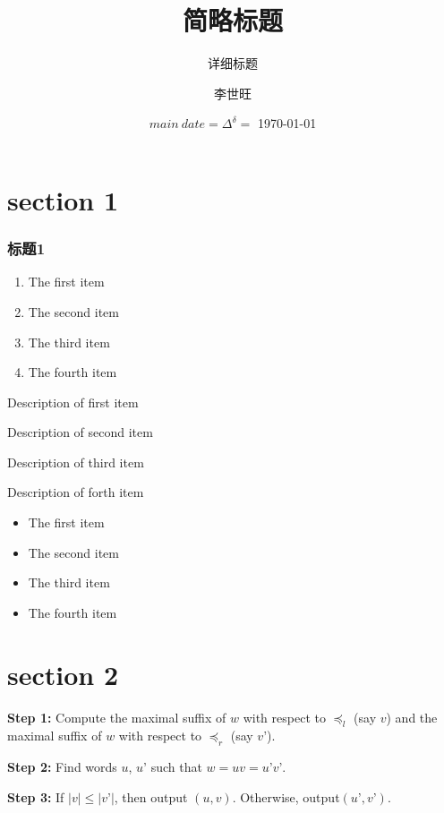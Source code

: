 \documentclass{beamer}
\begin{document}
\title{简略标题}
\subtitle{详细标题}
\author[1307402068李世旺]{李世旺}
\date{$main~date = \Delta^\delta = $ \today}
\section{section 1}
\begin{frame}\frametitle{标题1}
	\begin{enumerate}
\item The first item
\item The second item
\item The third item
\item The fourth item
	\end{enumerate}
\end{frame}
\begin{frame}
	\begin{description}
\item[First Item] Description of first item
\item[Second Item] Description of second item
\item[Third Item] Description of third item
\item[Forth Item] Description of forth item
	\end{description}
\end{frame}
\begin{frame}
	\begin{itemize}
\item The first item
\item The second item
\item The third item
\item The fourth item
	\end{itemize}
\end{frame}
\section{section 2}
\begin{frame}

\textbf{Step 1:} Compute the maximal suffix of $w$
with respect to $\preceq_l$ (say $v$) and the
maximal suffix of $w$ with respect to $\preceq_r$
(say $v’$).
\pause

\textbf{Step 2:} Find words $u$, $u’$ such that
$w = uv = u’v’$.
\pause

\textbf{Step 3:} If $|v| \le |v’|$, then output
$(u,v)$. Otherwise, output$(u’,v’)$.
\end{frame}
\end{document}
